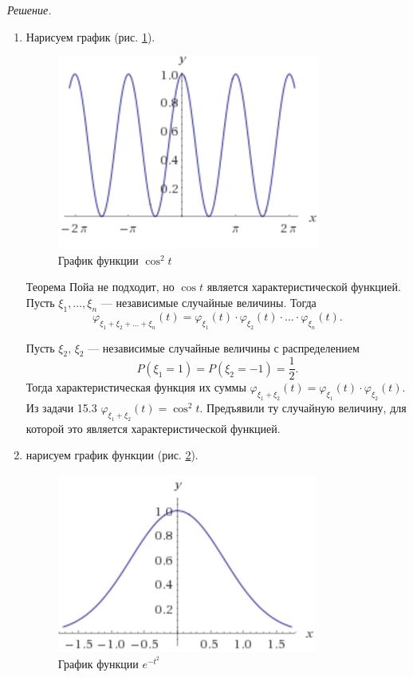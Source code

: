 \textit{Решение.}
\begin{enumerate}[label=\alph*)]
\item Нарисуем график (рис. \ref{fig:1562}).

\begin{figure}[h!]
  \centering
  \includegraphics[width=.4\textwidth]{./pictures/15_6_2.png}
  \caption{График функции $ \cos^2 t$}
  \label{fig:1562}
\end{figure}

Теорема Пойа не подходит, но $ \cos t$ является характеристической функцией.
Пусть $ \xi_1, \dotsc, \xi_n$ --- независимые случайные величины.
Тогда
$$ \varphi_{ \xi_1 + \xi_2 + \dotsc + \xi_n} \left( t \right) =
\varphi_{ \xi_1} \left( t \right) \cdot \varphi_{ \xi_2} \left( t \right) \cdot \dotsc \cdot \varphi_{ \xi_n} \left( t \right).$$

Пусть $ \xi_2, \, \xi_2$ --- независимые случайные величины с распределением
$$P \left( \xi_1 = 1 \right) =
P \left( \xi_2 = - 1 \right) =
\frac{1}{2}.$$
Тогда характеристическая функция их суммы $ \varphi_{ \xi_1 + \xi_2} \left( t \right) = \varphi_{ \xi_1} \left( t \right) \cdot \varphi_{ \xi_2} \left( t \right) $.
Из задачи 15.3 $ \varphi_{ \xi_1 + \xi_2} \left( t \right) = \cos^2 t$.
Предъявили ту случайную величину, для которой это является характеристической функцией.

\item нарисуем график функции (рис. \ref{fig:1561}).

\begin{figure}[h!]
  \centering
  \includegraphics[width=.4\textwidth]{./pictures/15_6_1.png}
  \caption{График функции $e^{- t^2}$}
  \label{fig:1561}
\end{figure}


\end{enumerate}
